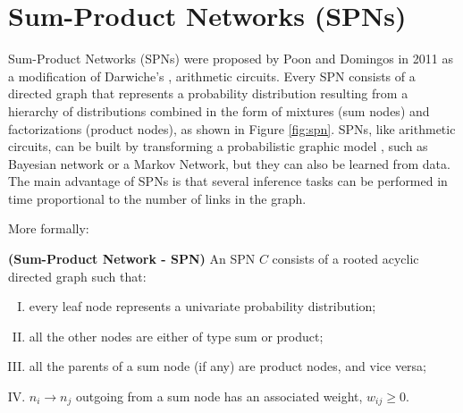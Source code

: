 \section{Sum-Product Networks (SPNs)}
Sum-Product Networks (SPNs) were proposed by Poon and Domingos \cite{poon2011sum} in 2011 as a modification of Darwiche's \cite{Darwiche:2002fj}, \cite{DBLP:journals/corr/abs-1301-3847} arithmetic circuits. Every SPN consists of a directed graph that represents a probability distribution resulting from a hierarchy of distributions combined in the form of mixtures (sum nodes) and factorizations (product nodes), as shown in Figure \ref{fig:spn}. SPNs, like arithmetic circuits, can be built by transforming a probabilistic graphic model \cite{koller2009probabilistic}, such as Bayesian network or a Markov Network, but they can also be learned from data. The main advantage of SPNs is that several inference tasks can be performed in time proportional to the number of links in the graph.

More formally:

\begin{definition}{\textbf{(Sum-Product Network - SPN)}}
\label{def:evi}
An SPN $C$ consists of a rooted acyclic directed graph such that:
\begin{enumerate}[I.]
  \item every leaf node represents a univariate probability distribution;
  \item all the other nodes are either of type sum or product;
  \item all the parents of a sum node (if any) are product nodes, and vice versa;
  \item $n_i \rightarrow n_j$ outgoing from a sum node has an associated weight, $w_{ij} \geq 0$.
\end{enumerate}
\end{definition}

